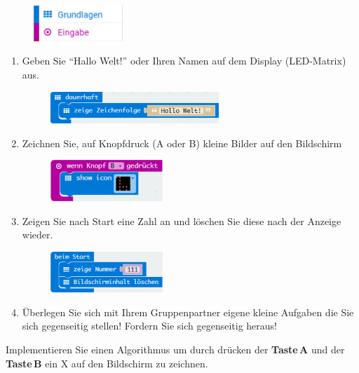 \documentclass{hmLab}
\begin{document}
\begin{figure}[h!]
	\centering
	\includegraphics[width=0.3\textwidth]{basics-input}
\end{figure}

\begin{enumerate}[label=$\bullet$]
	\item Geben Sie ``Hallo Welt!'' oder Ihren Namen auf dem Display (LED-Matrix) aus.
	\begin{figure}[h!]
		\centering
		\includegraphics[width=0.6\textwidth]{hello-world}
	\end{figure}
	\item Zeichnen Sie, auf Knopfdruck (A oder B) kleine Bilder auf den Bildschirm 
	\begin{figure}[h!]
		\centering
		\includegraphics[width=0.4\textwidth]{a-or-b}
	\end{figure}
	\item Zeigen Sie nach Start eine Zahl an und löschen Sie diese nach der Anzeige wieder.
	\begin{figure}[h!]
		\centering
		\includegraphics[width=0.4\textwidth]{show-number}
	\end{figure}
	\item Überlegen Sie sich mit Ihrem Gruppenpartner eigene kleine Aufgaben die Sie sich gegenseitig stellen! Fordern Sie sich gegenseitig heraus!
\end{enumerate}


Implementieren Sie einen Algorithmus um durch drücken der \textbf{Taste\,A} und der \textbf{Taste\,B} ein X auf den Bildschirm zu zeichnen.\\
\end{document}
